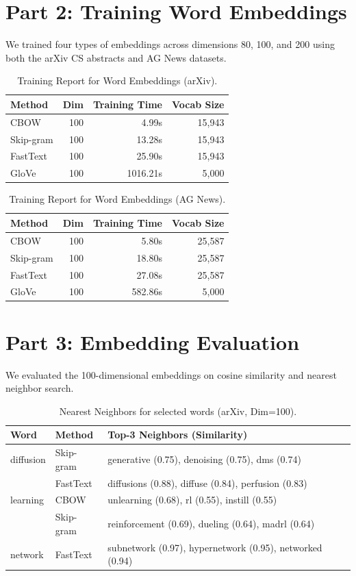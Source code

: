 \documentclass[11pt,a4paper]{article}
\begin{document}
\section{Part 2: Training Word Embeddings}
We trained four types of embeddings across dimensions 80, 100, and 200 using both the arXiv CS abstracts and AG News datasets.

\begin{table}[h]
\centering
\caption{Training Report for Word Embeddings (arXiv).}
\begin{tabular}{lrrr}
\toprule
Method & Dim & Training Time & Vocab Size \\
\midrule
CBOW & 100 & 4.99s & 15,943 \\
Skip-gram & 100 & 13.28s & 15,943 \\
FastText & 100 & 25.90s & 15,943 \\
GloVe & 100 & 1016.21s & 5,000 \\
\bottomrule
\end{tabular}
\end{table}

\begin{table}[h]
\centering
\caption{Training Report for Word Embeddings (AG News).}
\begin{tabular}{lrrr}
\toprule
Method & Dim & Training Time & Vocab Size \\
\midrule
CBOW & 100 & 5.80s & 25,587 \\
Skip-gram & 100 & 18.80s & 25,587 \\
FastText & 100 & 27.08s & 25,587 \\
GloVe & 100 & 582.86s & 5,000 \\
\bottomrule
\end{tabular}
\end{table}

\section{Part 3: Embedding Evaluation}
We evaluated the 100-dimensional embeddings on cosine similarity and nearest neighbor search.

\begin{table}[h]
\centering
\caption{Nearest Neighbors for selected words (arXiv, Dim=100).}
\begin{tabular}{lll}
\toprule
Word & Method & Top-3 Neighbors (Similarity) \\
\midrule
diffusion & Skip-gram & generative (0.75), denoising (0.75), dms (0.74) \\
          & FastText & diffusions (0.88), diffuse (0.84), perfusion (0.83) \\
learning  & CBOW & unlearning (0.68), rl (0.55), instill (0.55) \\
          & Skip-gram & reinforcement (0.69), dueling (0.64), madrl (0.64) \\
network   & FastText & subnetwork (0.97), hypernetwork (0.95), networked (0.94) \\
\bottomrule
\end{tabular}
\end{table}
\end{document}
